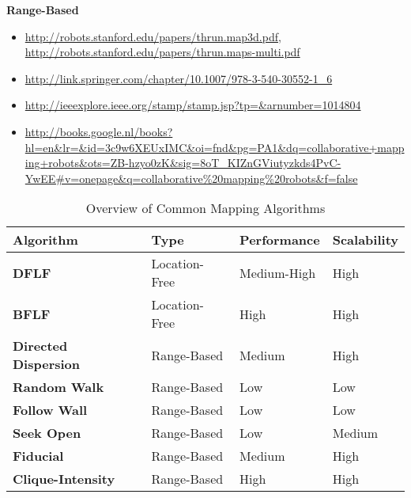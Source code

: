 \textbf{Range-Based}\\
\begin{itemize}
  \item \url{http://robots.stanford.edu/papers/thrun.map3d.pdf}, \url{http://robots.stanford.edu/papers/thrun.maps-multi.pdf}
  \item \url{http://link.springer.com/chapter/10.1007/978-3-540-30552-1_6}
  \item \url{http://ieeexplore.ieee.org/stamp/stamp.jsp?tp=&arnumber=1014804}
  \item \url{http://books.google.nl/books?hl=en&lr=&id=3c9w6XEUxIMC&oi=fnd&pg=PA1&dq=collaborative+mapping+robots&ots=ZB-hzyo0zK&sig=8oT_KIZnGViutyzkds4PvC-YwEE#v=onepage&q=collaborative%20mapping%20robots&f=false}
\end{itemize}

  \begin{table}[H]
  \renewcommand{\arraystretch}{1.3}
  \label{table_alg_mapping}
  \caption{Overview of Common Mapping Algorithms}
  \centering
    \begin{tabular}{|l|l|l|l|}
    \hline
    \bfseries Algorithm & \bfseries Type & \bfseries Performance & \bfseries Scalability\\
    \hline
    \bfseries DFLF& Location-Free & Medium-High & High\\\hline
    \bfseries BFLF & Location-Free & High & High\\\hline
    \bfseries Directed Dispersion & Range-Based & Medium & High\\\hline
    \bfseries Random Walk& Range-Based & Low & Low\\\hline
    \bfseries Follow Wall& Range-Based & Low & Low\\\hline
    \bfseries Seek Open& Range-Based & Low & Medium\\\hline
    \bfseries Fiducial& Range-Based & Medium & High\\\hline
    \bfseries Clique-Intensity& Range-Based & High & High\\\hline
    \end{tabular}
  \end{table}

